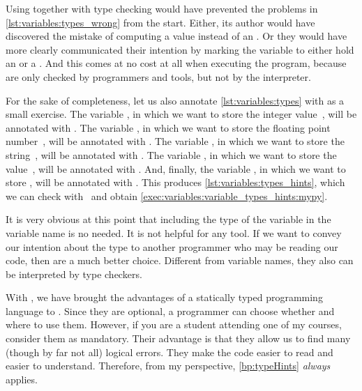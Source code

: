 Using  together with type checking would have prevented the problems in \cref{lst:variables:types_wrong} from the start.
Either, its author would have discovered the mistake of computing a  value instead of an .
Or they would have more clearly communicated their intention by marking the variable to either hold an  or a .
And this comes at no cost at all when executing the program, because  are only checked by programmers and tools, but not by the interpreter.
%
%
%
%
%

For the sake of completeness, let us also annotate \cref{lst:variables:types} with  as a small exercise.
The variable , in which we want to store the integer value~, will be annotated with .
The variable , in which we want to store the floating point number~, will be annotated with .
The variable , in which we want to store the string~, will be annotated with .
The variable , in which we want to store the value~, will be annotated with .
And, finally, the variable , in which we want to store , will be annotated with .
This produces \cref{lst:variables:types_hints}, which we can check with \mypy\ and obtain \cref{exec:variables:variable_types_hints:mypy}.

It is very obvious at this point that including the type of the variable in the variable name is no needed.
It is not helpful for any tool.
If we want to convey our intention about the type to another programmer who may be reading our code, then  are a much better choice.
Different from variable names, they also can be interpreted by type checkers.

With , we have brought the advantages of a statically typed programming language to \python.
Since they are optional, a programmer can choose whether and where to use them.
However, if you are a student attending one of my courses, consider them as mandatory.
Their advantage is that they allow us to find many (though by far not all) logical errors.
They make the code easier to read and easier to understand.
Therefore, from my perspective, \cref{bp:typeHints} \emph{always} applies.%
%
\FloatBarrier%
\endhsection%
%
\endhsection%
%
